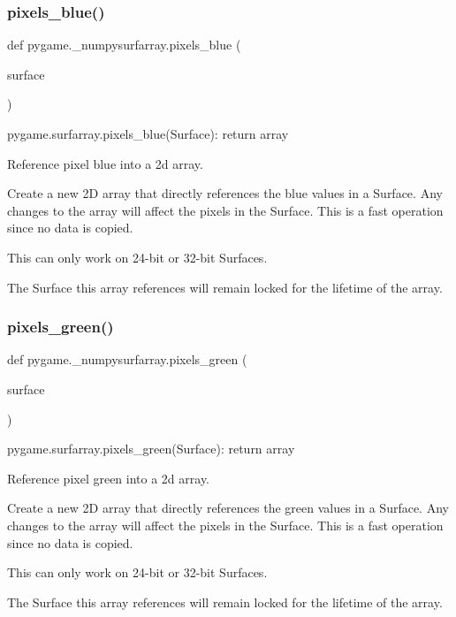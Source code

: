 \subsubsection{\texorpdfstring{pixels\+\_\+blue()}{pixels\_blue()}}
{\footnotesize\ttfamily def pygame.\+\_\+numpysurfarray.\+pixels\+\_\+blue (\begin{DoxyParamCaption}\item[{}]{surface }\end{DoxyParamCaption})}

\begin{DoxyVerb}pygame.surfarray.pixels_blue(Surface): return array

Reference pixel blue into a 2d array.

Create a new 2D array that directly references the blue values
in a Surface. Any changes to the array will affect the pixels
in the Surface. This is a fast operation since no data is copied.

This can only work on 24-bit or 32-bit Surfaces.

The Surface this array references will remain locked for the
lifetime of the array.
\end{DoxyVerb}
 \mbox{\label{namespacepygame_1_1__numpysurfarray_a9e59718e0b42824bccf0827ff8c94469}} 
\subsubsection{\texorpdfstring{pixels\+\_\+green()}{pixels\_green()}}
{\footnotesize\ttfamily def pygame.\+\_\+numpysurfarray.\+pixels\+\_\+green (\begin{DoxyParamCaption}\item[{}]{surface }\end{DoxyParamCaption})}

\begin{DoxyVerb}pygame.surfarray.pixels_green(Surface): return array

Reference pixel green into a 2d array.

Create a new 2D array that directly references the green values
in a Surface. Any changes to the array will affect the pixels
in the Surface. This is a fast operation since no data is copied.

This can only work on 24-bit or 32-bit Surfaces.

The Surface this array references will remain locked for the
lifetime of the array.
\end{DoxyVerb}
 \mbox{\label{namespacepygame_1_1__numpysurfarray_a5dc1c52039acb9e1734347069b3a8cce}} 
